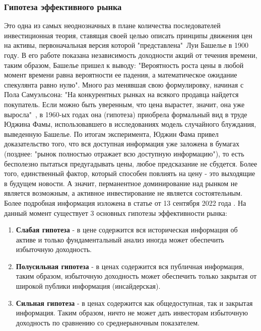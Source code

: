 		\subsubsection{Гипотеза эффективного рынка} \label{link::hypothsis_of_msrket_efficiency}
			Это одна из самых неоднозначных в плане количества последователей инвестиционная теория, ставящая своей целью описать принципы движения цен на активы, первоначальная версия которой "представлена"\ Луи Башелье в 1900 году. В его работе показана независимость доходности акций от течения времени, таким образом, Башелье пришел к выводу: "Вероятность роста цены в любой момент времени равна вероятности ее падения, а математическое ожидание спекулянта равно нулю". Много раз менявшая свою формулировку, начиная с Пола Самуэльсона: "На конкурентных рынках на всякого продавца найдется покупатель. Если можно быть уверенным, что цена вырастет, значит, она уже выросла"\ ,  в 1960-ых годах она (гипотеза) приобрела формальный вид в труде Юджина Фамы, использовавшего в исследованиях модель случайного блуждания, выведенную Башелье. По итогам эксперимента, Юджин Фама \cite{efficient_market} привел доказательство того, что вся доступная информация уже заложена в бумагах (позднее: "рынок полностью отражает всю доступную информацию"), то есть бесполезно пытаться предугадывать цены, любое предсказание не сбудется. Более того, единственный фактор, который способен повлиять на цену - это выходящие в будущем новости. А значит, перманентное доминирование над рынком не является возможным, а активное инвестирование не является состоятельным. Более подробная информация изложена в статье от 13 сентября 2022 года \cite{fama_market_efficiency}. На данный момент существует 3 основных гипотезы эффективности рынка:
			\begin{enumerate}
				\item \textbf{Слабая гипотеза} - в цене содержится вся историческая информация об активе и только фундаментальный анализ иногда может обеспечить избыточную доходность.
				\item \textbf{Полусильная гипотеза} - в ценах содержится вся публичная информация, таким образом, избыточную доходность может обеспечить только закрытая от широкой публики информация (инсайдерская).
				\item \textbf{Сильная гипотеза} - в ценах содержится как общедоступная, так и закрытая информация. Таким образом, ничто не может дать инвесторам избыточную доходность по сравнению со среднерыночным показателем.
			\end{enumerate}
